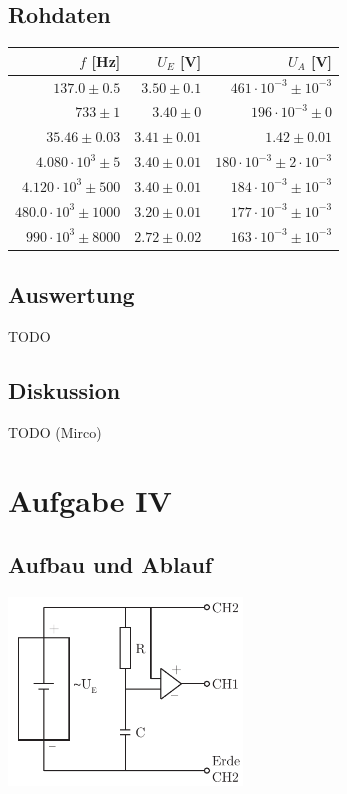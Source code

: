 \documentclass[12pt,a4paper]{article}
\begin{document}
\subsection*{Rohdaten} 
\begin{tabular}{|r|r|r|}
\hline
$f$ [Hz]&$U_E$ [V]&$U_A$ [V]\\
\hline
$137.0 \pm 0.5$&$3.50 \pm 0.1$&$461\cdot 10^{-3} \pm 10^{-3}$\\
$733 \pm 1$&$3.40 \pm 0$&$196\cdot 10^{-3} \pm 0$\\
$35.46 \pm 0.03$&$3.41 \pm 0.01$&$1.42 \pm 0.01$\\
$4.080\cdot 10^{3} \pm 5$&$3.40 \pm 0.01$&$180\cdot 10^{-3} \pm 2\cdot 10^{-3}$\\
$4.120\cdot 10^{3} \pm 500$&$3.40 \pm 0.01$&$184\cdot 10^{-3} \pm 10^{-3}$\\
$480.0\cdot 10^{3} \pm 1000$&$3.20 \pm 0.01$&$177\cdot 10^{-3} \pm 10^{-3}$\\
$990\cdot 10^{3} \pm 8000$&$2.72 \pm 0.02$&$163\cdot 10^{-3} \pm 10^{-3}$\\
\hline
\end{tabular}

\subsection*{Auswertung}
TODO

\subsection*{Diskussion}
TODO (Mirco)


\section*{Aufgabe IV}
\subsection*{Aufbau und Ablauf}
\includegraphics[height=5cm]{illustration4.pdf}
\end{document}
